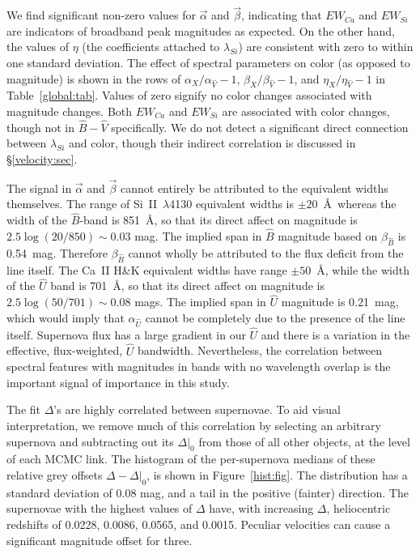 \documentclass{aastex61}   	%
\begin{document}
We find significant non-zero values for $\vec{\alpha}$ and $\vec{\beta}$, indicating that
$EW_{Ca}$ and $EW_{Si}$ are indicators of broadband
peak magnitudes
as expected.
On the other hand, the values of $\eta$ (the coefficients attached to $\lambda_{Si}$) are consistent with zero
to  within one standard deviation.
The effect of spectral parameters on color (as opposed to magnitude)
is shown in the rows of $\alpha_X/\alpha_{\hat{V}}-1$,  $\beta_X/\beta_{\hat{V}}-1$, and  $\eta_X/\eta_{\hat{V}}-1$
in Table~\ref{global:tab}.
Values of zero signify no color changes associated with magnitude changes.
Both $EW_{Ca}$ and $EW_{Si}$ are associated with color changes, though not in ${\hat{B}}-{\hat{V}}$ specifically.
We do not detect a significant direct connection between
$\lambda_{Si}$ and color, though their indirect correlation is discussed in \S\ref{velocity:sec}.

The signal in  $\vec{\alpha}$ and $\vec{\beta}$ cannot
entirely
be attributed to the equivalent widths themselves.
The range of Si~II~$\lambda$4130 equivalent widths is $\pm 20$~\AA\ whereas the width of the ${\hat{B}}$-band is 851~\AA, so that its direct affect on magnitude
is
$2.5 \log{(20/850)} \sim 0.03$ mag.  
The implied span in ${\hat{B}}$ magnitude based on $\beta_{\hat{B}}$ is 0.54~mag.  Therefore $\beta_{\hat{B}}$ cannot wholly be attributed to the flux deficit
from the line itself.
The Ca~II H\&K equivalent widths have range $\pm 50$~\AA, while the width of the ${\hat{U}}$ band is
701~\AA, so that its direct affect on magnitude
is
$2.5 \log{(50/701)} \sim 0.08$ mags.   The implied span in ${\hat{U}}$ magnitude is  0.21~mag, 
which would imply that  $\alpha_{\hat{U}}$ cannot be completely due to the 
presence of the line itself.  
Supernova flux has a large gradient in our $\hat{U}$ and there is a variation in the effective, flux-weighted,  $\hat{U}$ bandwidth. 
Nevertheless, the  correlation between spectral features with magnitudes in bands with no wavelength overlap is the
important signal of importance in this study.


The fit $\Delta$'s are highly correlated between supernovae.  To aid 
\color{red} visual interpretation, we remove much of this
correlation by
selecting an arbitrary supernova and subtracting out its $\Delta|_0$ from those of all other objects, at the level of each MCMC link. \color{black}
The histogram of the \color{red} per-supernova \color{black} medians of these relative  grey offsets $\Delta-\Delta|_0$,
is shown in Figure~\ref{hist:fig}.  The distribution
has a standard deviation of
$0.08$
mag, and a tail in the positive (fainter) direction.
The supernovae with the highest values of $\Delta$ have, with increasing $\Delta$, heliocentric
 redshifts of 0.0228, 0.0086, 0.0565, and 0.0015.  Peculiar velocities  can cause a significant magnitude offset for three.
\end{document}
